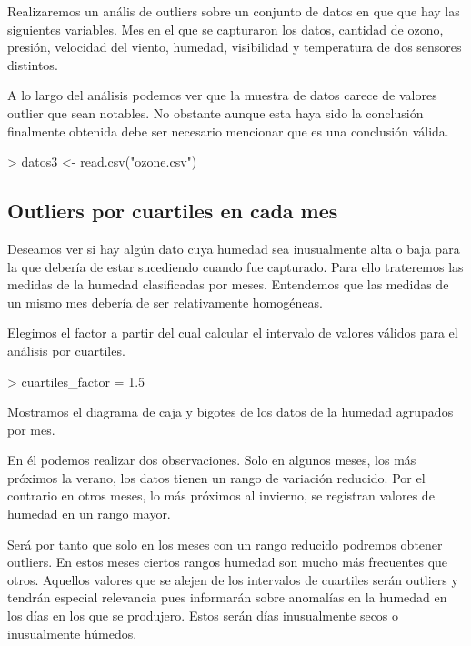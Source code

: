 \documentclass [a4paper] {article}
\begin{document}
Realizaremos un anális de outliers sobre un conjunto de datos en que que hay las siguientes variables.
Mes en el que se capturaron los datos, cantidad de ozono, presión, velocidad del viento, humedad, visibilidad y temperatura de dos sensores distintos.

A lo largo del análisis podemos ver que la muestra de datos carece de valores outlier que sean notables.
No obstante aunque esta haya sido la conclusión finalmente obtenida debe ser necesario mencionar que es una conclusión válida.

\begin{Schunk}
\begin{Sinput}
> datos3 <- read.csv("ozone.csv")
\end{Sinput}
\end{Schunk}

\subsection{Outliers por cuartiles en cada mes}

Deseamos ver si hay algún dato cuya humedad sea inusualmente alta o baja para la que debería de estar sucediendo cuando fue capturado.
Para ello trateremos las medidas de la humedad clasificadas por meses.
Entendemos que las medidas de un mismo mes debería de ser relativamente homogéneas.

Elegimos el factor a partir del cual calcular el intervalo de valores válidos para el análisis por cuartiles.
\begin{Schunk}
\begin{Sinput}
> cuartiles_factor = 1.5
\end{Sinput}
\end{Schunk}

Mostramos el diagrama de caja y bigotes de los datos de la humedad agrupados por mes.

En él podemos realizar dos observaciones.
Solo en algunos meses, los más próximos la verano, los datos tienen un rango de variación reducido.
Por el contrario en otros meses, lo más próximos al invierno, se registran valores de humedad en un rango mayor.

Será por tanto que solo en los meses con un rango reducido podremos obtener outliers.
En estos meses ciertos rangos humedad son mucho más frecuentes que otros.
Aquellos valores que se alejen de los intervalos de cuartiles serán outliers y tendrán especial relevancia pues informarán sobre anomalías en la humedad en los días en los que se produjero.
Estos serán días inusualmente secos o inusualmente húmedos.
\end{document}

